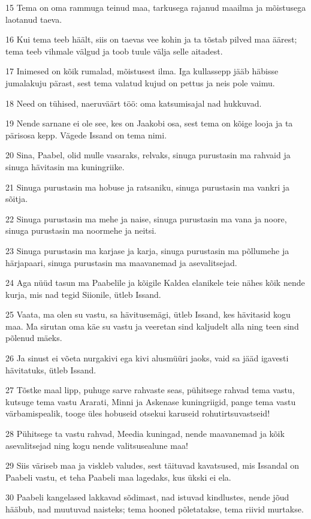 \par 15 Tema on oma rammuga teinud maa, tarkusega rajanud maailma ja mõistusega laotanud taeva.
\par 16 Kui tema teeb häält, siis on taevas vee kohin ja ta tõstab pilved maa äärest; tema teeb vihmale välgud ja toob tuule välja selle aitadest.
\par 17 Inimesed on kõik rumalad, mõistusest ilma. Iga kullassepp jääb häbisse jumalakuju pärast, sest tema valatud kujud on pettus ja neis pole vaimu.
\par 18 Need on tühised, naeruväärt töö: oma katsumisajal nad hukkuvad.
\par 19 Nende sarnane ei ole see, kes on Jaakobi osa, sest tema on kõige looja ja ta pärisosa kepp. Vägede Issand on tema nimi.
\par 20 Sina, Paabel, olid mulle vasaraks, relvaks, sinuga purustasin ma rahvaid ja sinuga hävitasin ma kuningriike.
\par 21 Sinuga purustasin ma hobuse ja ratsaniku, sinuga purustasin ma vankri ja sõitja.
\par 22 Sinuga purustasin ma mehe ja naise, sinuga purustasin ma vana ja noore, sinuga purustasin ma noormehe ja neitsi.
\par 23 Sinuga purustasin ma karjase ja karja, sinuga purustasin ma põllumehe ja härjapaari, sinuga purustasin ma maavanemad ja asevalitsejad.
\par 24 Aga nüüd tasun ma Paabelile ja kõigile Kaldea elanikele teie nähes kõik nende kurja, mis nad tegid Siionile, ütleb Issand.
\par 25 Vaata, ma olen su vastu, sa hävitusemägi, ütleb Issand, kes hävitasid kogu maa. Ma sirutan oma käe su vastu ja veeretan sind kaljudelt alla ning teen sind põlenud mäeks.
\par 26 Ja sinust ei võeta nurgakivi ega kivi alusmüüri jaoks, vaid sa jääd igavesti hävitatuks, ütleb Issand.
\par 27 Tõstke maal lipp, puhuge sarve rahvaste seas, pühitsege rahvad tema vastu, kutsuge tema vastu Ararati, Minni ja Askenase kuningriigid, pange tema vastu värbamispealik, tooge üles hobuseid otsekui karuseid rohutirtsuvastseid!
\par 28 Pühitsege ta vastu rahvad, Meedia kuningad, nende maavanemad ja kõik asevalitsejad ning kogu nende valitsusealune maa!
\par 29 Siis väriseb maa ja viskleb valudes, sest täituvad kavatsused, mis Issandal on Paabeli vastu, et teha Paabeli maa lagedaks, kus ükski ei ela.
\par 30 Paabeli kangelased lakkavad sõdimast, nad istuvad kindlustes, nende jõud hääbub, nad muutuvad naisteks; tema hooned põletatakse, tema riivid murtakse.
